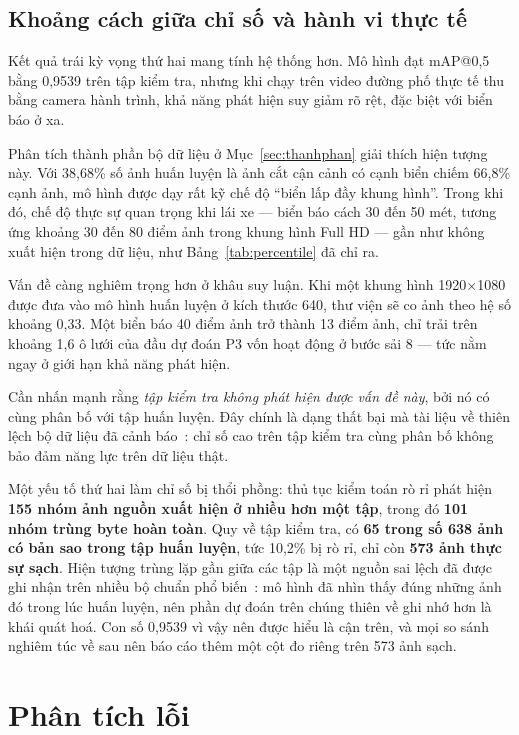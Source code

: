 \subsection{Khoảng cách giữa chỉ số và hành vi thực tế}

Kết quả trái kỳ vọng thứ hai mang tính hệ thống hơn. Mô hình đạt mAP@0,5 bằng 0,9539 trên tập kiểm
tra, nhưng khi chạy trên video đường phố thực tế thu bằng camera hành trình, khả năng phát hiện
suy giảm rõ rệt, đặc biệt với biển báo ở xa.

Phân tích thành phần bộ dữ liệu ở Mục~\ref{sec:thanhphan} giải thích hiện tượng này. Với 38,68\%
số ảnh huấn luyện là ảnh cắt cận cảnh có cạnh biển chiếm 66,8\% cạnh ảnh, mô hình được dạy rất kỹ
chế độ ``biển lấp đầy khung hình''. Trong khi đó, chế độ thực sự quan trọng khi lái xe --- biển báo
cách 30 đến 50 mét, tương ứng khoảng 30 đến 80 điểm ảnh trong khung hình Full HD --- gần như không
xuất hiện trong dữ liệu, như Bảng~\ref{tab:percentile} đã chỉ ra.

Vấn đề càng nghiêm trọng hơn ở khâu suy luận. Khi một khung hình 1920$\times$1080 được đưa vào mô
hình huấn luyện ở kích thước 640, thư viện sẽ co ảnh theo hệ số khoảng 0,33. Một biển báo 40 điểm
ảnh trở thành 13 điểm ảnh, chỉ trải trên khoảng 1,6 ô lưới của đầu dự đoán P3 vốn hoạt động ở bước
sải 8 --- tức nằm ngay ở giới hạn khả năng phát hiện.

Cần nhấn mạnh rằng \emph{tập kiểm tra không phát hiện được vấn đề này}, bởi nó có cùng phân bố với
tập huấn luyện. Đây chính là dạng thất bại mà tài liệu về thiên lệch bộ dữ liệu đã cảnh
báo~\cite{torralba2011bias,recht2019imagenetv2}: chỉ số cao trên tập kiểm tra cùng phân bố không
bảo đảm năng lực trên dữ liệu thật.

Một yếu tố thứ hai làm chỉ số bị thổi phồng: thủ tục kiểm toán rò rỉ phát hiện \textbf{155 nhóm ảnh
nguồn xuất hiện ở nhiều hơn một tập}, trong đó \textbf{101 nhóm trùng byte hoàn toàn}. Quy về tập
kiểm tra, có \textbf{65 trong số 638 ảnh có bản sao trong tập huấn luyện}, tức 10,2\% bị rò rỉ, chỉ
còn \textbf{573 ảnh thực sự sạch}. Hiện tượng trùng lặp gần giữa các tập là một nguồn sai lệch đã được
ghi nhận trên nhiều bộ chuẩn phổ biến~\cite{barz2020duplicates}: mô hình đã nhìn thấy đúng những
ảnh đó trong lúc huấn luyện, nên phần dự đoán trên chúng thiên về ghi nhớ hơn là khái quát hoá. Con
số 0,9539 vì vậy nên được hiểu là cận trên, và mọi so sánh nghiêm túc về sau nên báo cáo thêm một
cột đo riêng trên 573 ảnh sạch.

\section{Phân tích lỗi}

